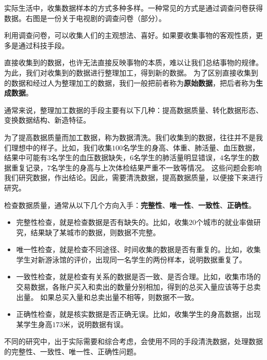 \documentclass[12pt,UTF8]{ctexbook}
\begin{document}
实际生活中，收集数据样本的方式多种多样。一种常见的方式是通过调查问卷获得数据。右图是一份关于电视剧的调查问卷（部分）。

利用调查问卷，可以收集人们的主观想法、喜好。如果要收集事物的客观性质，更多是通过科技手段。

直接收集到的数据，也许无法直接反映事物的本质，难以让我们总结事物的规律。
为此，我们对收集到的数据进行整理加工，得到新的数据。
为了区别直接收集到的数据和经过人为整理加工的数据，我们一般把前者称为\textbf{原始数据}，把后者称为\textbf{生成数据}。

通常来说，整理加工数据的手段主要有以下几种：提高数据质量、转化数据形态、变换数据结构、新造特征。

为了提高数据质量而加工数据，称为数据清洗。我们收集到的数据，往往并不是我们理想中的样子。比如，我们收集$100$名学生的身高、体重、肺活量、血压数据，
结果中可能有$3$名学生的血压数据缺失，$6$名学生的肺活量明显错误，$4$名学生的数据重复记录，$7$名学生的身高与上次体检结果严重不一致等情况。
这些问题会影响我们研究数据，作出结论。因此，需要清洗数据，提高数据质量，以便接下来进行研究。

检查数据质量，通常从以下几个方向入手：\textbf{完整性}、\textbf{唯一性}、\textbf{一致性}、\textbf{正确性}。
\begin{itemize}
    \item 完整性检查，就是检查数据是否有缺失的。比如，收集$20$个城市的就业率做研究，结果缺了某城市的数据，则数据不完整。
    \item 唯一性检查，就是检查不同途径、时间收集的数据是否有重复的。比如，收集学生对新游泳馆的评价，出现同一名学生的两份样本，说明数据重复了。
    \item 一致性检查，就是检查有关系的数据是否一致、是否合理。比如，收集市场的交易数据，各账户买入和卖出的数量分别相加，得到的总买入量应该等于总卖出量。
    如果总买入量和总卖出量不相等，则数据不一致。
    \item 正确性检查，就是核实数据是否正确无误。比如，收集学生的身高数据，出现某学生身高$173$米，说明数据有误。
\end{itemize}
不同的研究中，出于实际需要和综合考虑，会使用不同的手段清洗数据，处理数据的完整性、一致性、唯一性、正确性问题。
\end{document}
